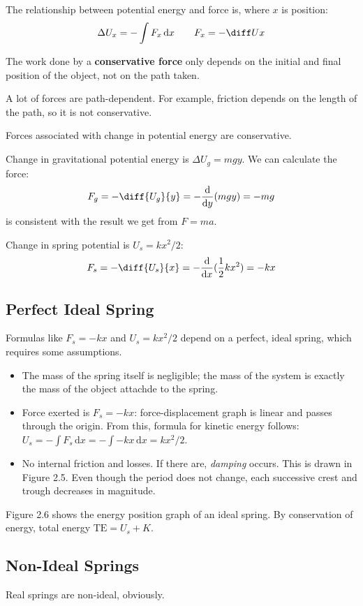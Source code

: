 \documentclass{article}
\newcommand{\definition}[1]{\begin{tcolorbox}[colback=red!5!white,colframe=red!75!black,parbox=false] #1 \end{tcolorbox}}
\newcommand{\theorem}[2]{\begin{tcolorbox}[title={#1},colback=blue!5!white,colframe=blue!75!black,parbox=false] #2 \end{tcolorbox}}
\newcommand{\example}[2]{\begin{tcolorbox}[title={Example: #1},colback=brown!5!white,colframe=brown!75!black,parbox=false] #2 \end{tcolorbox}}
\newcommand*{\deriv}[1][x]{\ensuremath{\dfrac{\mathrm{d}}{\mathrm{d}#1}}}
\begin{document}
\theorem{Potential energy}{
	The relationship between potential energy and force is, where $x$ is position:
	\begin{equation*}
	    \Delta U_x=-\int F_x\,\mathrm{d}x
		\qquad
		F_x=-\diff Ux
	\end{equation*}
}

\definition{The work done by a \textbf{conservative force} only depends on the initial and final position of the object, not on the path taken.}

A lot of forces are path-dependent. For example, friction depends on the length of the path, so it is not conservative.

Forces associated with change in potential energy are conservative.

\example{Gravitional potential}{
	Change in gravitational potential energy is $\Delta U_g=mgy$. We can calculate the force:
	\begin{equation*}
		F_g=-\diff{U_g}{y}=-\deriv[y](mgy)=-mg
	\end{equation*}
	is consistent with the result we get from $F=ma$.
}

\example{Spring potential}{
	Change in spring potential is $U_s=kx^2/2$:
	\begin{equation*}
		F_s=-\diff{U_s}{x}=-\deriv[x](\frac12kx^2)=-kx
	\end{equation*}
}

\subsection{Perfect Ideal Spring}

Formulas like $F_s=-kx$ and $U_s=kx^2/2$ depend on a perfect, ideal spring, which requires some assumptions.
\begin{itemize}
	\item The mass of the spring itself is negligible; the mass of the system is exactly the mass of the object attachde to the spring.
	\item Force exerted is $F_s=-kx$: force-displacement graph is linear and passes through the origin. From this, formula for kinetic energy follows: $U_s=-\int F_s\,\mathrm{d}x=-\int -kx\,\mathrm{d}x=kx^2/2$.
	\item No internal friction and losses. If there are, \textit{damping} occurs. This is drawn in Figure 2.5. Even though the period does not change, each successive crest and trough decreases in magnitude.
\end{itemize}

Figure 2.6 shows the energy position graph of an ideal spring. By conservation of energy, total energy $\text{TE}=U_s+K$.

\subsection{Non-Ideal Springs}

Real springs are non-ideal, obviously.
\end{document}
